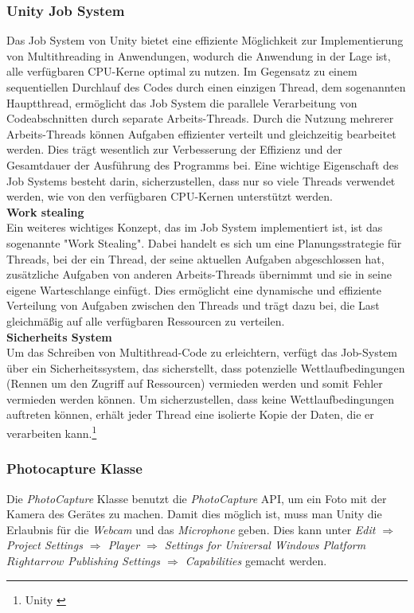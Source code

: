 \subsubsection{Unity Job System} 
Das Job System von Unity bietet eine effiziente Möglichkeit zur Implementierung von Multithreading in Anwendungen,
wodurch die Anwendung in
der Lage ist, alle verfügbaren CPU-Kerne optimal zu nutzen. Im Gegensatz zu einem sequentiellen Durchlauf des Codes
durch einen einzigen Thread, dem sogenannten Hauptthread, ermöglicht das Job System die parallele Verarbeitung von
Codeabschnitten durch separate Arbeits-Threads. Durch die Nutzung mehrerer Arbeits-Threads können Aufgaben effizienter
verteilt und gleichzeitig bearbeitet werden. Dies trägt wesentlich zur Verbesserung der Effizienz und der Gesamtdauer
der Ausführung des Programms bei. Eine wichtige Eigenschaft des Job Systems besteht darin, sicherzustellen, dass nur
so viele Threads verwendet werden, wie von den verfügbaren CPU-Kernen unterstützt werden.\\
\textbf{Work stealing}\\
Ein weiteres wichtiges Konzept, das im Job System implementiert ist, ist das sogenannte "Work Stealing". Dabei handelt
es sich um eine Planungsstrategie für Threads, bei der ein Thread, der seine aktuellen Aufgaben abgeschlossen hat,
zusätzliche Aufgaben von anderen Arbeits-Threads übernimmt und sie in seine eigene Warteschlange einfügt. Dies ermöglicht
eine dynamische und effiziente Verteilung von Aufgaben zwischen den Threads und trägt dazu bei, die Last gleichmäßig auf
alle verfügbaren Ressourcen zu verteilen. \\
\textbf{Sicherheits System} \\
Um das Schreiben von Multithread-Code zu erleichtern, verfügt das Job-System über ein Sicherheitssystem, das sicherstellt,
dass potenzielle Wettlaufbedingungen (Rennen um den Zugriff auf Ressourcen) vermieden werden und somit Fehler vermieden
werden können. Um sicherzustellen, dass keine Wettlaufbedingungen auftreten können, erhält jeder Thread eine isolierte
Kopie der Daten, die er verarbeiten kann.\protect\footnote{Unity \cite{Job System}}

\subsubsection{Photocapture Klasse}
Die \textit{PhotoCapture} Klasse benutzt die \textit{PhotoCapture} API, um ein Foto mit der Kamera des Gerätes zu machen.
Damit dies möglich ist, muss man Unity die Erlaubnis für die \textit{Webcam} und das \textit{Microphone} geben.
Dies kann unter \textit{Edit $\Rightarrow$ Project Settings $\Rightarrow$ Player $\Rightarrow$ Settings for Universal
Windows Platform $Rightarrow$ Publishing Settings $\Rightarrow$ Capabilities} gemacht werden.

